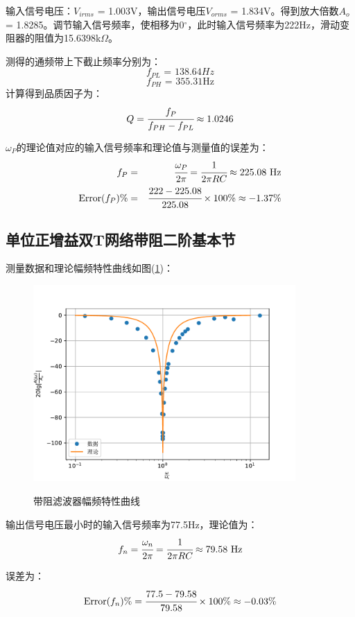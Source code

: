 \documentclass[a4paper]{article}
\begin{document}
输入信号电压：$V_{irms}$ = 1.003V，输出信号电压$V_{orms}$ = 1.834V。得到放大倍数$A_o$ = 1.8285。调节输入信号频率，使相移为0$^{\circ}$，此时输入信号频率为222Hz，滑动变阻器的阻值为15.6398k$\Omega$。

测得的通频带上下截止频率分别为：
$$f_{PL}\text{ = 138.64}Hz$$
$$f_{PH}\text{ = 355.31Hz}$$
计算得到品质因子为：
\begin{equation}
Q = \cfrac{f_P}{f_{PH} - f_{PL}} \approx 1.0246
\end{equation}

$\omega_P$的理论值对应的输入信号频率和理论值与测量值的误差为：
\begin{eqnarray}
f_P &=& \cfrac{\omega_P}{2\pi} = \cfrac{1}{2\pi RC} \approx 225.08\text{ Hz}\label{f_P} \\
\text{Error($f_P$)\%} &=& \cfrac{222 - 225.08}{225.08}\times 100\% \approx -1.37\%
\end{eqnarray}
\subsection{单位正增益双T网络带阻二阶基本节}
测量数据和理论幅频特性曲线如图(\ref{datafig4})：
\begin{figure}[!h]
\centering
\includegraphics[width=10cm]{fig/datafig4.pdf}\\
\caption{带阻滤波器幅频特性曲线}\label{datafig4}
\end{figure}

输出信号电压最小时的输入信号频率为77.5Hz，理论值为：
\begin{equation}
f_n = \cfrac{\omega_n}{2\pi} = \cfrac{1}{2\pi RC} \approx 79.58\text{ Hz}
\end{equation}

误差为：
\begin{equation}
\text{Error($f_n$)\%} = \cfrac{77.5 - 79.58}{79.58}\times 100\% \approx -0.03\%
\end{equation}
\end{document}
